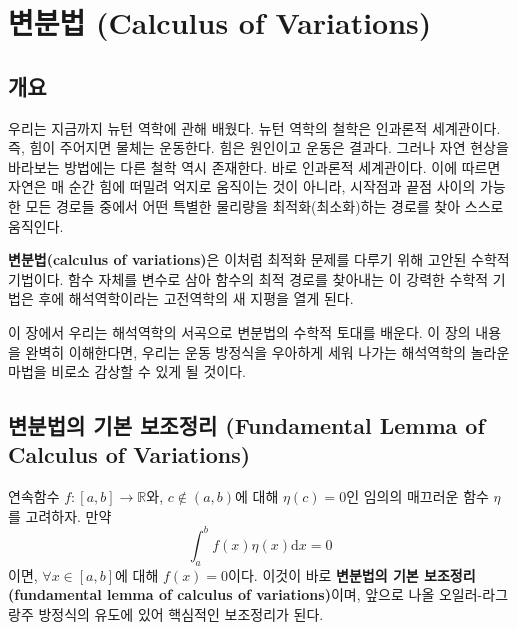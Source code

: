 \documentclass[chapter, oneside, b5paper]{oblivoir}
\theoremstyle{plain}
\theoremstyle{definition}
\theoremstyle{remark}
\begin{document}
\newpage
\chapter{변분법 (Calculus of Variations)}

\section{개요}
우리는 지금까지 뉴턴 역학에 관해 배웠다. 뉴턴 역학의 철학은 인과론적 세계관이다. 즉, 힘이 주어지면 물체는 운동한다. 힘은 원인이고 운동은 결과다. 그러나 자연 현상을 바라보는 방법에는 다른 철학 역시 존재한다. 바로 인과론적 세계관이다. 이에 따르면 자연은 매 순간 힘에 떠밀려 억지로 움직이는 것이 아니라, 시작점과 끝점 사이의 가능한 모든 경로들 중에서 어떤 특별한 물리량을 최적화(최소화)하는 경로를 찾아 스스로 움직인다.

\textbf{변분법(calculus of variations)}은 이처럼 최적화 문제를 다루기 위해 고안된 수학적 기법이다. 함수 자체를 변수로 삼아 함수의 최적 경로를 찾아내는 이 강력한 수학적 기법은 후에 해석역학이라는 고전역학의 새 지평을 열게 된다.

이 장에서 우리는 해석역학의 서곡으로 변분법의 수학적 토대를 배운다. 이 장의 내용을 완벽히 이해한다면, 우리는 운동 방정식을 우아하게 세워 나가는 해석역학의 놀라운 마법을 비로소 감상할 수 있게 될 것이다.

\section{변분법의 기본 보조정리 (Fundamental Lemma of Calculus of Variations)}
연속함수 $f:[a, b] \to \mathbb{R}$와, $c \notin (a, b)$에 대해 $\eta(c) = 0$인 임의의 매끄러운 함수 $\eta$를 고려하자. 만약
\begin{equation}
    \int_a^b f(x) \eta(x) \mathrm{d}x = 0
    \label{eq:5.1}
\end{equation}
이면, $\forall x \in [a, b]$에 대해 $f(x) = 0$이다. 이것이 바로 \textbf{변분법의 기본 보조정리(fundamental lemma of calculus of variations)}이며, 앞으로 나올 오일러-라그랑주 방정식의 유도에 있어 핵심적인 보조정리가 된다.
\end{document}
